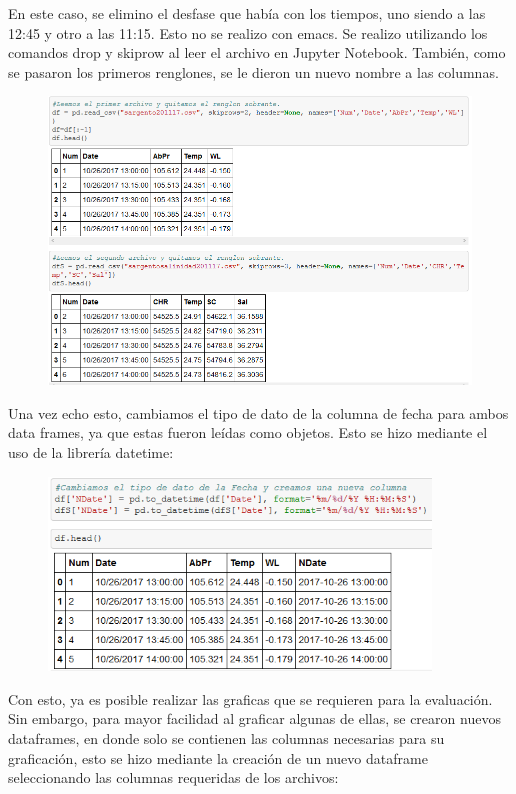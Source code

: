 \documentclass[12pt]{article}
\begin{document}
En este caso, se elimino el desfase que había con los tiempos, uno siendo a las 12:45 y otro a las 11:15. Esto no se realizo con emacs. Se realizo utilizando los comandos drop y skiprow al leer el archivo en Jupyter Notebook. También, como se pasaron los primeros renglones, se le dieron un nuevo nombre a las columnas. \\

\begin{figure}[h]
    \centering
\includegraphics[width=5in]{Datos.png}
\end{figure}

Una vez echo esto, cambiamos el tipo de dato de la columna de fecha para ambos data frames, ya que estas fueron leídas como objetos. Esto se hizo mediante el uso de la librería datetime:

\begin{figure}[h]
    \centering
\includegraphics[width=4in]{date.png}
\end{figure}

Con esto, ya es posible realizar las graficas que se requieren para la evaluación. Sin embargo, para mayor facilidad al graficar algunas de ellas, se crearon nuevos dataframes, en donde solo se contienen las columnas necesarias para su graficación, esto se hizo mediante la creación de un nuevo dataframe seleccionando las columnas requeridas de los archivos:
\end{document}
